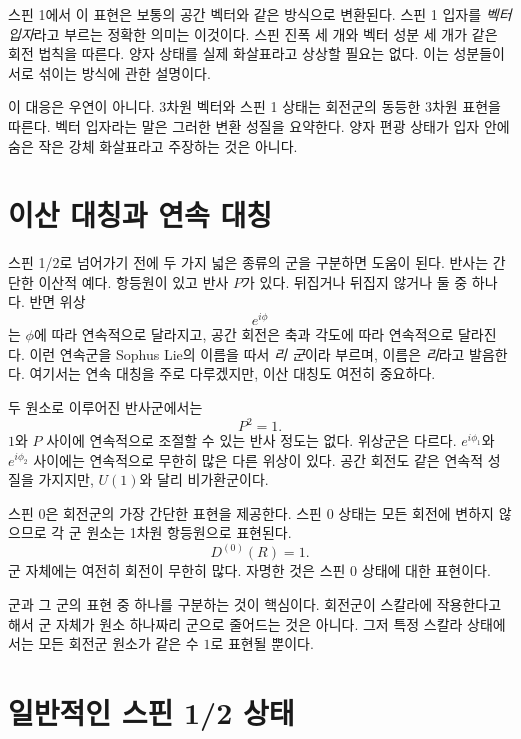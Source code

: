 스핀 1에서 이 표현은 보통의 공간 벡터와 같은 방식으로 변환된다. 스핀 1 입자를 \emph{벡터 입자}라고 부르는 정확한 의미는 이것이다. 스핀 진폭 세 개와 벡터 성분 세 개가 같은 회전 법칙을 따른다. 양자 상태를 실제 화살표라고 상상할 필요는 없다. 이는 성분들이 서로 섞이는 방식에 관한 설명이다.

이 대응은 우연이 아니다. 3차원 벡터와 스핀 1 상태는 회전군의 동등한 3차원 표현을 따른다. {벡터 입자}라는 말은 그러한 변환 성질을 요약한다. 양자 편광 상태가 입자 안에 숨은 작은 강체 화살표라고 주장하는 것은 아니다.

\section{이산 대칭과 연속 대칭}

스핀 1/2로 넘어가기 전에 두 가지 넓은 종류의 군을 구분하면 도움이 된다. 반사는 간단한 이산적 예다. 항등원이 있고 반사 \(P\)가 있다. 뒤집거나 뒤집지 않거나 둘 중 하나다. 반면 위상 \begin{equation}
e^{i\phi}
\end{equation}는 \(\phi\)에 따라 연속적으로 달라지고, 공간 회전은 축과 각도에 따라 연속적으로 달라진다. 이런 연속군을 Sophus Lie의 이름을 따서 \emph{리 군}이라 부르며, 이름은 \emph{리}라고 발음한다. 여기서는 연속 대칭을 주로 다루겠지만, 이산 대칭도 여전히 중요하다.

두 원소로 이루어진 반사군에서는
\begin{equation}
P^2=1.
\end{equation}
\(1\)와 \(P\) 사이에 연속적으로 조절할 수 있는 반사 정도는 없다. 위상군은 다르다. \(e^{i\phi_1}\)와 \(e^{i\phi_2}\) 사이에는 연속적으로 무한히 많은 다른 위상이 있다. 공간 회전도 같은 연속적 성질을 가지지만, \(U(1)\)와 달리 비가환군이다.

스핀 0은 회전군의 가장 간단한 표현을 제공한다. 스핀 0 상태는 모든 회전에 변하지 않으므로 각 군 원소는 1차원 항등원으로 표현된다.
\begin{equation}
D^{(0)}(R)=1.
\end{equation}
군 자체에는 여전히 회전이 무한히 많다. 자명한 것은 스핀 0 상태에 대한 표현이다.

군과 그 군의 표현 중 하나를 구분하는 것이 핵심이다. 회전군이 스칼라에 작용한다고 해서 군 자체가 원소 하나짜리 군으로 줄어드는 것은 아니다. 그저 특정 스칼라 상태에서는 모든 회전군 원소가 같은 수 \(1\)로 표현될 뿐이다.

\section{일반적인 스핀 1/2 상태}

